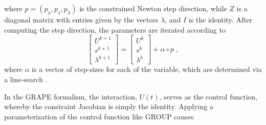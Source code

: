 where $p = ( p_x , p_s , p_{\lambda} )$ is the constrained Newton step direction, while $Z$ is a diagonal matrix with entries given by the vectors $\lambda$, and $I$ is the identity.
After computing the step direction, the parameters are iterated according to 
\begin{equation}
\begin{bmatrix}
  U^{k+1} \\ s^{k+1} \\ \lambda^{k+1} 
\end{bmatrix} 
=
\begin{bmatrix}
  U^{k} \\ s^{k} \\ \lambda^{k} 
\end{bmatrix} 
+ \alpha \circ p \; ,
\label{eq:ConNewtonStep}
\end{equation}
where $\alpha$ is a vector of step-sizes for each of the variable, which are determined via a line-search \cite{Wachter2005,Fletcher2002}.

In the GRAPE formalism, the interaction, $U(t)$, serves as the control function, whereby the constraint Jacobian is simply the identity. Applying a parameterization of the control function like GROUP causes 